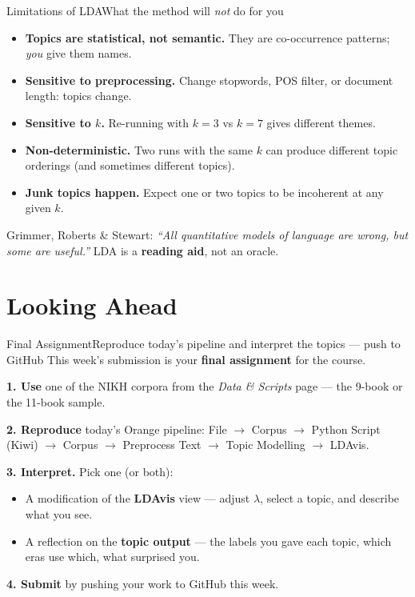 \documentclass[aspectratio=169,10pt]{beamer}
\begin{document}
\begin{frame}{Limitations of LDA}{What the method will \emph{not} do for you}
  \begin{itemize}
    \item \textbf{Topics are statistical, not semantic.} They are co-occurrence patterns; \emph{you} give them names.
    \item \textbf{Sensitive to preprocessing.} Change stopwords, POS filter, or document length: topics change.
    \item \textbf{Sensitive to $k$.} Re-running with $k=3$ vs $k=7$ gives different themes.
    \item \textbf{Non-deterministic.} Two runs with the same $k$ can produce different topic orderings (and sometimes different topics).
    \item \textbf{Junk topics happen.} Expect one or two topics to be incoherent at any given $k$.
  \end{itemize}

  \vspace{0.3em}
  \begin{callcoral}
    Grimmer, Roberts \& Stewart: \emph{``All quantitative models of language are wrong, but some are useful.''}
    LDA is a \textbf{reading aid}, not an oracle.
  \end{callcoral}
\end{frame}

\section{Looking Ahead}

\begin{frame}{Final Assignment}{Reproduce today's pipeline and interpret the topics --- push to GitHub}
  This week's submission is your \textbf{final assignment} for the course.

  \vspace{0.5em}
  \textbf{1. Use} one of the NIKH corpora from the \emph{Data \& Scripts} page --- the 9-book or the 11-book sample.

  \vspace{0.3em}
  \textbf{2. Reproduce} today's Orange pipeline: File $\to$ Corpus $\to$ Python Script (Kiwi) $\to$ Corpus $\to$ Preprocess Text $\to$ Topic Modelling $\to$ LDAvis.

  \vspace{0.3em}
  \textbf{3. Interpret.} Pick one (or both):
  \begin{itemize}
    \item A modification of the \textbf{LDAvis} view --- adjust $\lambda$, select a topic, and describe what you see.
    \item A reflection on the \textbf{topic output} --- the labels you gave each topic, which eras use which, what surprised you.
  \end{itemize}

  \vspace{0.3em}
  \textbf{4. Submit} by pushing your work to GitHub this week.
\end{frame}
\end{document}
